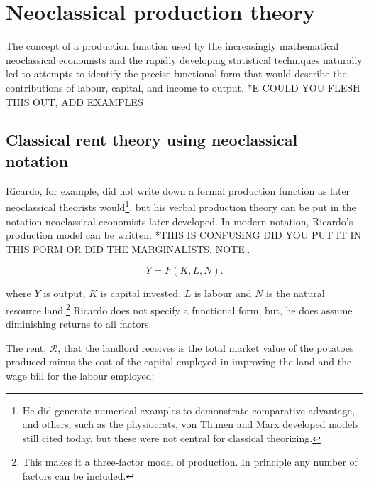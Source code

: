\section{Neoclassical production theory}
The concept of a production function used by the increasingly mathematical neoclassical economists and  the rapidly developing statistical techniques  naturally led to attempts to identify the precise \gls{functional form} that would describe the contributions of labour, capital, and income to output.
*E COULD YOU FLESH THIS OUT, ADD EXAMPLES %
 
\subsection{Classical rent theory using neoclassical notation}
Ricardo, for example, did not write down a formal production function as later \gls{neoclassical} theorists would\footnote{He did generate numerical examples to demonstrate comparative advantage, and others, such as the physiocrats, von Th\"unen and Marx developed models still cited today, but these were not central for classical theorizing. }, but his verbal production theory can be put in the notation neoclassical economists later developed. In modern notation, Ricardo's production model can be written: 
*THIS IS CONFUSING DID YOU PUT IT IN THIS FORM OR DID THE MARGINALISTS. NOTE.. %

\begin{equation} 
Y=F(K,L,N).
\label{eqn-production-ricardo}
\end{equation} 

where  $Y$ is output, $K$ is capital invested, $L$ is labour and $N$  is the natural resource land.\footnote{This makes it a three-factor model of production.  In principle any number of factors can be included.}  
Ricardo does not specify a functional form, but, %
he does assume diminishing returns to all factors. 

The  rent, $\mathcal{R}$, that the landlord receives is the total market value of the potatoes produced minus the cost of the capital employed in improving the land and the wage bill for the labour employed: 

